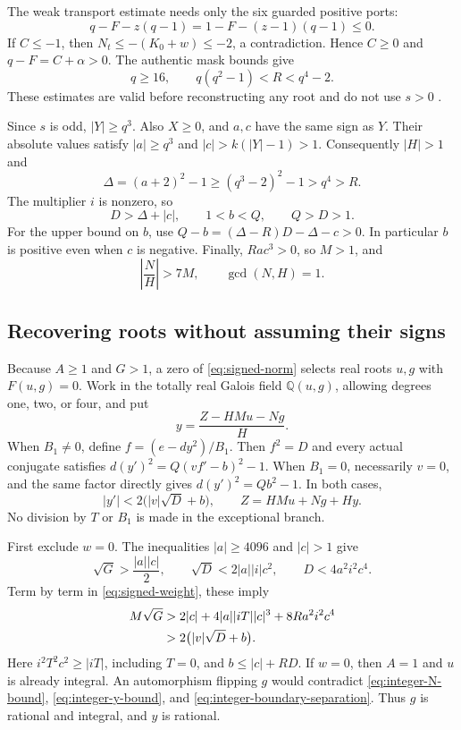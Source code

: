 The weak transport estimate needs only the six guarded positive ports:
\[
 q-F-z(q-1)=1-F-(z-1)(q-1)\leq0.
\]
If $C\leq-1$, then $N_t\leq-(K_0+w)\leq-2$, a contradiction.
Hence $C\geq0$ and $q-F=C+\alpha>0$. The authentic mask bounds give
\begin{equation}\label{eq:integer-mask-bound}
 q\geq16,\qquad q(q^2-1)<R<q^4-2.
\end{equation}
These estimates are valid before reconstructing any root and do not use
$s>0$ \cite{normalized,repo19}.

Since $s$ is odd, $|Y|\geq q^3$. Also $X\geq0$, and $a,c$ have
the same sign as $Y$. Their absolute values satisfy
$|a|\geq q^3$ and $|c|>k(|Y|-1)>1$. Consequently $|H|>1$ and
\[
 \Delta=(a+2)^2-1\geq(q^3-2)^2-1>q^4>R.
\]
The multiplier $i$ is nonzero, so
\begin{equation}\label{eq:integer-pre-root}
 D>\Delta+|c|,\qquad 1<b<Q,\qquad Q>D>1.
\end{equation}
For the upper bound on $b$, use
$Q-b=(\Delta-R)D-\Delta-c>0$. In particular $b$ is positive even
when $c$ is negative. Finally, $Ra c^3>0$, so $M>1$, and
\begin{equation}\label{eq:integer-N-bound}
 \left|\frac NH\right|>7M,\qquad \gcd(N,H)=1.
\end{equation}

\subsection{Recovering roots without assuming their signs}

Because $A\geq1$ and $G>1$, a zero of \eqref{eq:signed-norm}
selects real roots $u,g$ with $F(u,g)=0$. Work in the totally real
Galois field $\mathbb Q(u,g)$, allowing degrees one, two, or four, and put
\[
 y=\frac{Z-HMu-Ng}{H}.
\]
When $B_1\ne0$, define $f=(e-dy^2)/B_1$. Then $f^2=D$ and every
actual conjugate satisfies
$d(y')^2=Q(vf'-b)^2-1$. When $B_1=0$, necessarily $v=0$, and the
same factor directly gives $d(y')^2=Qb^2-1$. In both cases,
\begin{equation}\label{eq:integer-y-bound}
 |y'|<2\bigl(|v|\sqrt D+b\bigr),\qquad
 Z=HMu+Ng+Hy.
\end{equation}
No division by $T$ or $B_1$ is made in the exceptional branch.

First exclude $w=0$. The inequalities $|a|\geq4096$ and $|c|>1$ give
\[
 \sqrt G>\frac{|a||c|}{2},\qquad
 \sqrt D<2|a||i|c^2,\qquad D<4a^2i^2c^4.
\]
Term by term in \eqref{eq:signed-weight}, these imply
\begin{align}
 M\sqrt G
 &>2|c|+4|a||iT||c|^3+8Ra^2i^2c^4\notag\\
 &>2\bigl(|v|\sqrt D+b\bigr).
 \label{eq:integer-boundary-separation}
\end{align}
Here $i^2T^2c^2\geq|iT|$, including $T=0$, and
$b\leq|c|+RD$. If $w=0$, then $A=1$ and $u$ is already integral.
An automorphism flipping $g$ would contradict
\eqref{eq:integer-N-bound}, \eqref{eq:integer-y-bound}, and
\eqref{eq:integer-boundary-separation}. Thus $g$ is rational and
integral, and $y$ is rational.


